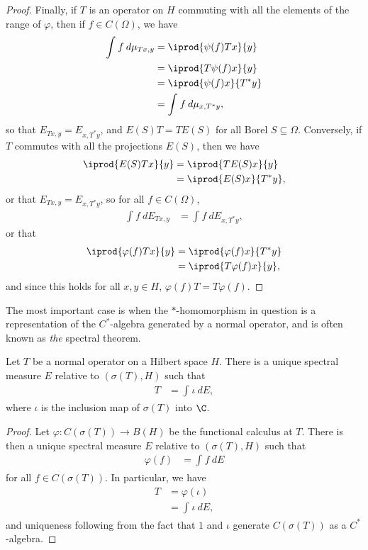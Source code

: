\documentclass[10pt]{mypackage}
\begin{document}
\begin{proof}
  Finally, if $T$ is an operator on $H$ commuting with all the elements of the range of $\varphi$, then if $f\in C(\Omega)$, we have
  \begin{align*}
    \int_{}^{} f\:d\mu_{Tx,y} &= \iprod{\psi(f)Tx}{y}\\
                              &= \iprod{T\psi(f)x}{y}\\
                              &= \iprod{\psi(f)x}{T^{\ast}y}\\
                              &= \int_{}^{} f\:d\mu_{x,T^{\ast}y},
  \end{align*}
  so that $E_{Tx,y} = E_{x,T^{\ast}y}$, and $E(S)T = TE(S)$ for all Borel $S\subseteq \Omega$. Conversely, if $T$ commutes with all the projections $E(S)$, then we have
  \begin{align*}
    \iprod{E(S)Tx}{y} &= \iprod{TE(S)x}{y}\\
                      &= \iprod{E(S)x}{T^{\ast}y},
  \end{align*}
  or that $E_{Tx,y} = E_{x,T^{\ast}y}$, so for all $f\in C(\Omega)$,
  \begin{align*}
    \int_{}^{} f\:dE_{Tx,y} &= \int_{}^{} f\:dE_{x,T^{\ast}y},
  \end{align*}
  or that
  \begin{align*}
    \iprod{\varphi(f)Tx}{y} &= \iprod{\varphi(f)x}{T^{\ast}y}\\
                           &= \iprod{T\varphi(f)x}{y},
  \end{align*}
  and since this holds for all $x,y\in H$, $\varphi(f)T = T\varphi(f)$.
\end{proof}
The most important case is when the $\ast$-homomorphism in question is a representation of the $C^{\ast}$-algebra generated by a normal operator, and is often known as \textit{the} spectral theorem.
\begin{theorem}
  Let $T$ be a normal operator on a Hilbert space $H$. There is a unique spectral measure $E$ relative to $\left( \sigma(T),H \right)$ such that
  \begin{align*}
    T &= \int_{}^{} \iota\:dE,
  \end{align*}
  where $\iota$ is the inclusion map of $\sigma(T)$ into $\C$.
\end{theorem}
\begin{proof}
  Let $\varphi\colon C(\sigma(T))\rightarrow B(H)$ be the functional calculus at $T$. There is then a unique spectral measure $E$ relative to $(\sigma(T),H)$ such that
  \begin{align*}
    \varphi(f) &= \int_{}^{} f\:dE
  \end{align*}
  for all $f\in C(\sigma(T))$. In particular, we have
  \begin{align*}
    T &= \varphi(\iota)\\
      &= \int_{}^{} \iota\:dE,
  \end{align*}
  and uniqueness following from the fact that $1$ and $\iota$ generate $C(\sigma(T))$ as a $C^{\ast}$-algebra.
\end{proof}
\end{document}
